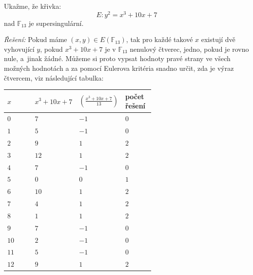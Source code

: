 \documentclass [12pt]{report}
\begin{document}
\begin{priklad}
Ukažme, že křivka:
$$E: y^2 = x^3+10x+7$$
nad $\mathbb{F}_{13}$ je supersingulární.
\end{priklad}
\textit{Řešení: } Pokud máme $(x,y) \in E(\mathbb{F}_{13})$, tak pro každé takové $x$ existují dvě vyhovující $y$, pokud $x^3+10x+7$ je v $\mathbb{F}_{13}$ nenulový čtverec, jedno, pokud je rovno nule, a~jinak žádné. Můžeme si proto vypsat hodnoty pravé strany ve všech možných hodnotách a za pomocí Eulerova kritéria snadno určit, zda je výraz čtvercem, viz následující tabulka:
\begin{longtable}[H]{l>{\centering}p{0.2\linewidth}>{\centering}p{0.2\linewidth}>{\centering\arraybackslash}p{0.2\linewidth}}
\toprule
$x$ & $x^3+10x+7$ & $\genfrac{(}{)}{}{}{x^3+10x+7}{13}$ & počet řešení\\
\midrule
$0$ & $7$  & $-1$  & $0$\\
$1$ & $5$  & $-1$  & $0$\\
$2$ & $9$  & $1$  & $2$\\
$3$ & $12$  & $1$  & $2$\\
$4$ & $7$  & $-1$  & $0$\\
$5$ & $0$  & $0$  & $1$\\
$6$ & $10$  & $1$  & $2$\\
$7$ & $4$  & $1$  & $2$\\
$8$ & $1$  & $1$  & $2$\\
$9$ & $7$  & $-1$  & $0$\\
$10$ & $2$  & $-1$  & $0$\\
$11$ & $5$  & $-1$  & $0$\\
$12$ & $9$  & $1$  & $2$\\
\bottomrule 
\end{longtable}
\end{document}
